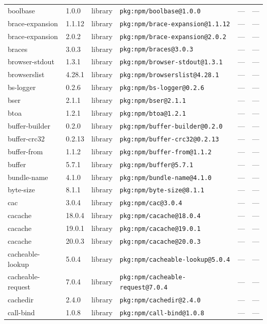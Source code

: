 \documentclass[11pt]{article}
\begin{document}
\begin{longtable}{|l|l|l|p{2.2cm}|l|p{4cm}|}
boolbase & 1.0.0 & library & \texttt{pkg:npm/boolbase@1.0.0} & — & — \\
brace-expansion & 1.1.12 & library & \texttt{pkg:npm/brace-expansion@1.1.12} & — & — \\
brace-expansion & 2.0.2 & library & \texttt{pkg:npm/brace-expansion@2.0.2} & — & — \\
braces & 3.0.3 & library & \texttt{pkg:npm/braces@3.0.3} & — & — \\
browser-stdout & 1.3.1 & library & \texttt{pkg:npm/browser-stdout@1.3.1} & — & — \\
browserslist & 4.28.1 & library & \texttt{pkg:npm/browserslist@4.28.1} & — & — \\
bs-logger & 0.2.6 & library & \texttt{pkg:npm/bs-logger@0.2.6} & — & — \\
bser & 2.1.1 & library & \texttt{pkg:npm/bser@2.1.1} & — & — \\
btoa & 1.2.1 & library & \texttt{pkg:npm/btoa@1.2.1} & — & — \\
buffer-builder & 0.2.0 & library & \texttt{pkg:npm/buffer-builder@0.2.0} & — & — \\
buffer-crc32 & 0.2.13 & library & \texttt{pkg:npm/buffer-crc32@0.2.13} & — & — \\
buffer-from & 1.1.2 & library & \texttt{pkg:npm/buffer-from@1.1.2} & — & — \\
buffer & 5.7.1 & library & \texttt{pkg:npm/buffer@5.7.1} & — & — \\
bundle-name & 4.1.0 & library & \texttt{pkg:npm/bundle-name@4.1.0} & — & — \\
byte-size & 8.1.1 & library & \texttt{pkg:npm/byte-size@8.1.1} & — & — \\
cac & 3.0.4 & library & \texttt{pkg:npm/cac@3.0.4} & — & — \\
cacache & 18.0.4 & library & \texttt{pkg:npm/cacache@18.0.4} & — & — \\
cacache & 19.0.1 & library & \texttt{pkg:npm/cacache@19.0.1} & — & — \\
cacache & 20.0.3 & library & \texttt{pkg:npm/cacache@20.0.3} & — & — \\
cacheable-lookup & 5.0.4 & library & \texttt{pkg:npm/cacheable-lookup@5.0.4} & — & — \\
cacheable-request & 7.0.4 & library & \texttt{pkg:npm/cacheable-request@7.0.4} & — & — \\
cachedir & 2.4.0 & library & \texttt{pkg:npm/cachedir@2.4.0} & — & — \\
call-bind & 1.0.8 & library & \texttt{pkg:npm/call-bind@1.0.8} & — & — \\

\end{longtable}
\end{document}

